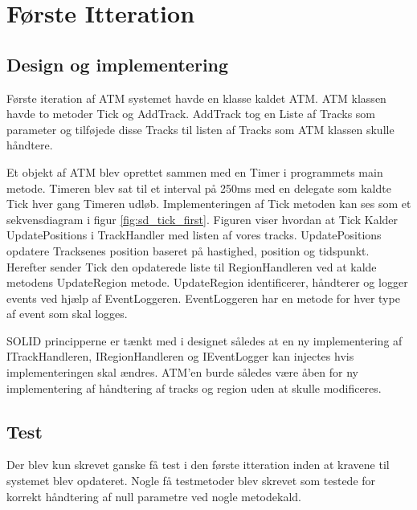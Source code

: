 \thispagestyle{fancy}
\chapter{Første Itteration}
\label{chp:FirstItteration}

\section{Design og implementering}


Første iteration af ATM systemet havde en klasse kaldet ATM. ATM klassen havde to metoder Tick og AddTrack. AddTrack tog en Liste af Tracks som parameter og tilføjede disse Tracks til listen af Tracks som ATM klassen skulle håndtere. 

Et objekt af ATM blev oprettet sammen med en Timer i programmets main metode. Timeren blev sat til et interval på 250ms med en delegate som kaldte Tick hver gang Timeren udløb. Implementeringen af Tick metoden kan ses som et sekvensdiagram i figur \ref{fig:sd_tick_first}. Figuren viser hvordan at Tick Kalder UpdatePositions i TrackHandler med listen af vores tracks. UpdatePositions opdatere Tracksenes position baseret på hastighed, position og tidspunkt. Herefter sender Tick den opdaterede liste til RegionHandleren ved at kalde metodens UpdateRegion metode. UpdateRegion identificerer, håndterer og logger events ved hjælp af EventLoggeren. EventLoggeren har en metode for hver type af event som skal logges.

SOLID principperne er tænkt med i designet således at en ny implementering af ITrackHandleren, IRegionHandleren og IEventLogger kan injectes hvis implementeringen skal ændres. ATM'en burde således være åben for ny implementering af håndtering af tracks og region uden at skulle modificeres.

\section{Test}
Der blev kun skrevet ganske få test i den første itteration inden at kravene til systemet blev opdateret. Nogle få testmetoder blev skrevet som testede for korrekt håndtering af null parametre ved nogle metodekald.



